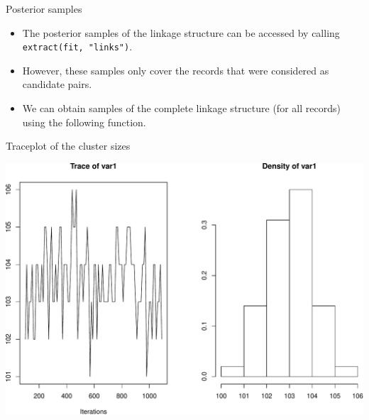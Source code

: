 \documentclass[
  ignorenonframetext,
]{beamer}
\newenvironment{Shaded}{\begin{snugshade}}{\end{snugshade}}
\newcommand{\KeywordTok}[1]{\textcolor[rgb]{0.13,0.29,0.53}{\textbf{#1}}}
\newcommand{\NormalTok}[1]{#1}
\newcommand{\OperatorTok}[1]{\textcolor[rgb]{0.81,0.36,0.00}{\textbf{#1}}}
\newcommand{\StringTok}[1]{\textcolor[rgb]{0.31,0.60,0.02}{#1}}
\begin{document}
\begin{frame}[fragile]{Posterior samples}
\protect\hypertarget{posterior-samples}{}

\begin{itemize}
\item
  The posterior samples of the linkage structure can be accessed by
  calling \texttt{extract(fit,\ "links")}.
\item
  However, these samples only cover the records that were considered as
  candidate pairs.
\item
  We can obtain samples of the complete linkage structure (for all
  records) using the following function.
\end{itemize}

\begin{Shaded}
\end{Shaded}

\end{frame}

\begin{frame}{Traceplot of the cluster sizes}
\protect\hypertarget{traceplot-of-the-cluster-sizes}{}

\includegraphics{bayesian-fellegi-sunter-vignette_files/figure-beamer/unnamed-chunk-9-1.pdf}

\end{frame}
\end{document}

